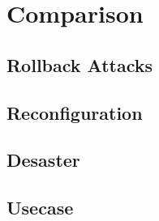 \section{Comparison}
\subsection{Rollback Attacks}
\subsection{Reconfiguration}
\subsection{Desaster}
\subsection{Usecase}